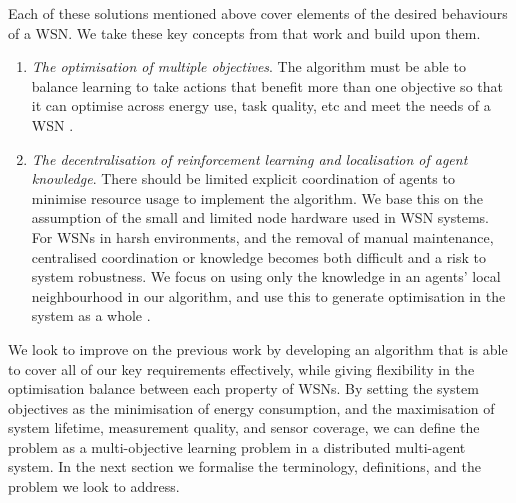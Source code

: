 Each of these solutions mentioned above cover elements of the desired behaviours of a WSN. We take these key concepts from that work and build upon them.

\begin{enumerate}
	\item \textit{The optimisation of multiple objectives}.  The algorithm must be able to balance learning to take actions that benefit more than one objective so that it can optimise across energy use, task quality, etc and meet the needs of a WSN \cite{Guo2019, s150717572, SENGUPTA2013405}.
	\item \textit{The decentralisation of reinforcement learning and localisation of agent knowledge}. There should be limited explicit coordination of agents to minimise resource usage to implement the algorithm. We base this on the assumption of the small and limited node hardware used in WSN systems. For WSNs in harsh environments, and the removal of manual maintenance, centralised coordination or knowledge becomes both difficult and a risk to system robustness. We focus on using only the knowledge in an agents' local neighbourhood in our algorithm, and use this to generate optimisation in the system as a whole  \citep{10.1007/978-3-642-11814-2_4}.
\end{enumerate}

We look to improve on the previous work by developing an algorithm that is able to cover all of our key requirements effectively, while giving flexibility in the optimisation balance between each property of WSNs. By setting the system objectives as the minimisation of energy consumption, and the maximisation of system lifetime, measurement quality, and sensor coverage, we can define the problem as a multi-objective learning problem in a distributed multi-agent system. In the next section we formalise the terminology, definitions, and the problem we look to address.


